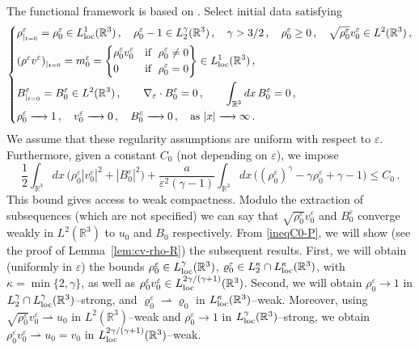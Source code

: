 \documentclass[11pt,reqno]{amsart}
\def \R{{\mathbb{R}}}
\begin{document}
The functional framework is based on \cite{HW10,LM98}. Select initial data satisfying
\begin{equation}
  \label{reg-ic-mhdep-R}
   \left\{
   \begin{aligned}
     & \rho^\varepsilon_{|_{t=0}}=\rho_0^\varepsilon\in L_{\rm loc }^1(\R^3)\,, 
     \quad \rho_0^\varepsilon -1 \in L_2^\gamma(\R^3)\,,  \quad  \gamma>3/2\,,
     \quad \rho_0^\varepsilon \geq 0\,,
     \quad \sqrt{\rho_0^\varepsilon} v_0^\varepsilon \in L^2(\R^3)\,, \\
     &(\rho^\varepsilon v^\varepsilon)_{|_{t=0}} = m_0^\varepsilon =
     \left\{
     \begin{aligned}
       & \rho_0^\varepsilon v_0^\varepsilon & \mbox{if } \ \rho_0^\varepsilon\neq 0\\
       & 0  & \mbox{if }\ \rho_0^\varepsilon= 0
     \end{aligned}
     \right\}
     \in L_{\rm loc}^{1}(\R^3)\,, \\
     & B^\varepsilon_{|_{t=0}}=B_0^\varepsilon \in L^2(\R^3)\,, \qquad \nabla_\varepsilon \cdot B_0^\varepsilon=0 \, , \qquad \int_{\R^3} dx \, B_0^\varepsilon=0 \,, \\
      & \rho_0^\varepsilon \xrightarrow{\quad} 1\,, \quad v_0^\varepsilon \xrightarrow{\quad} 0\,, \quad
    B_0^\varepsilon \xrightarrow{\quad} 0\,, \quad \mbox{as } |x| \xrightarrow{\quad} \infty\,. 
   \end{aligned}
  \right.
\end{equation}
We assume that these regularity assumptions are uniform with respect to $\varepsilon$. Furthermore, given a constant $C_0$ (not depending on $\varepsilon$), we impose 
\begin{equation}
  \label{ineqC0-R}
  \frac 12 \int_{\R^3} dx\, \big( \rho_0^\varepsilon |v_0^\varepsilon|^2 + |B_0^\varepsilon|^2\big) + \frac{a}{\varepsilon^2(\gamma-1)}
  \int_{\R^3} dx\, \big( (\rho_0^\varepsilon)^\gamma - \gamma  \rho_0^\varepsilon 
  + \gamma -1\big) \leq C_0\,.
\end{equation}
This bound gives access to weak compactness. Modulo the extraction of subsequences (which are not specified) we can say that $\sqrt{\rho_0^\varepsilon } v_0^\varepsilon$ and $B_0^\varepsilon$ converge weakly in $L^2(\R^3)$ to $u_0$ and $B_0$ respectively. From \eqref{ineqC0-P}, we will show (see the proof of Lemma~\ref{lem:cv-rho-R}) the subsequent results. First, we will  obtain (uniformly in $\varepsilon$) the bounds $ \rho_0^\varepsilon  \in  L_{\rm loc }^\gamma(\R^3)$, $ \varrho_0^\varepsilon \in  L_2^\kappa \cap L_{\rm loc}^\kappa (\R^3)$, with $\kappa=\min\{2,\gamma\}$, as well as $ \rho_0^\varepsilon v_0^\varepsilon \in L_{\rm loc}^{2\gamma/(\gamma+1)} (\R^3)$. Second, we will obtain $\rho_0^\varepsilon \rightarrow 1$ in $L_2^\gamma\cap L_{\rm loc}^\gamma(\R^3)$--strong, and $\varrho_0^\varepsilon \rightharpoonup \varrho_0$ in $L_{\rm loc}^\kappa(\R^3)$--weak. Moreover, using $\sqrt{\rho_0^\varepsilon } v_0^\varepsilon \rightharpoonup u_0$ in  $L^2(\R^3)$--weak and $\rho_0^\varepsilon \rightarrow 1$ in $L_{\rm loc}^\gamma(\R^3)$--strong, we obtain $\rho_0^\varepsilon v_0^\varepsilon \rightharpoonup u_0 = v_0$ in $ L_{\rm loc}^{2\gamma/(\gamma+1)}(\R^3)$--weak.
\end{document}
